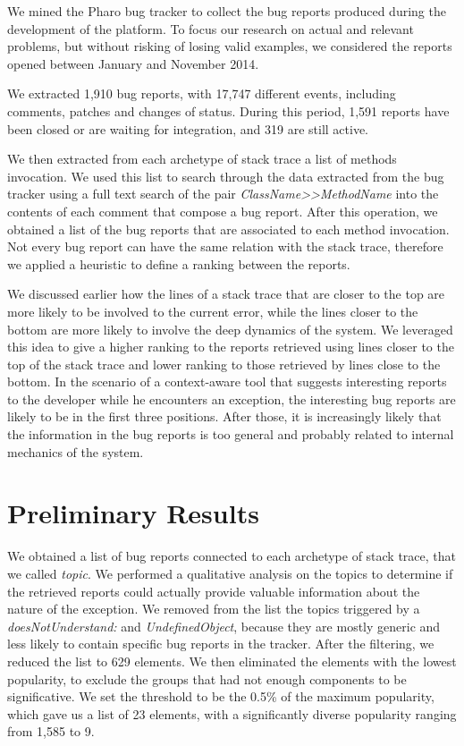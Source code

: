 We mined the Pharo bug tracker to collect the bug reports produced during the development of the platform.
To focus our research on actual and relevant problems, but without risking of losing valid examples, we considered the reports opened between January and November 2014.

We extracted 1,910 bug reports, with 17,747 different events, including comments, patches and changes of status.
During this period, 1,591 reports have been closed or are waiting for integration, and 319 are still active.

We then extracted from each archetype of stack trace a list of methods invocation.
We used this list to search through the data extracted from the bug tracker using a full text search of the pair \emph{ClassName{>}{>}MethodName} into the contents of each comment that compose a bug report.
After this operation, we obtained a list of the bug reports that are associated to each method invocation.
Not every bug report can have the same relation with the stack trace, therefore we applied a heuristic to define a ranking between the reports.

We discussed earlier how the lines of a stack trace that are closer to the top are more likely to be involved to the current error, while the lines closer to the bottom are more likely to involve the deep dynamics of the system.
We leveraged this idea to give a higher ranking to the reports retrieved using lines closer to the top of the stack trace and lower ranking to those retrieved by lines close to the bottom.
In the scenario of a context-aware tool that suggests interesting reports to the developer while he encounters an exception, the interesting bug reports are likely to be in the first three positions.
After those, it is increasingly likely that the information in the bug reports is too general and probably related to internal mechanics of the system.



\section{Preliminary Results}\label{sec:stacktraces-evaluation}

We obtained a list of bug reports connected to each archetype of stack trace, that we called \emph{topic}.
We performed a qualitative analysis on the topics to determine if the retrieved reports could actually provide valuable information about the nature of the exception.
We removed from the list the topics triggered by a \emph{doesNotUnderstand:} and \emph{UndefinedObject}, because they are mostly generic and less likely to contain specific bug reports in the tracker.
After the filtering, we reduced the list to 629 elements.
We then eliminated the elements with the lowest popularity, to exclude the groups that had not enough components to be significative.
We set the threshold to be the 0.5\% of the maximum popularity, which gave us a list of 23 elements, with a significantly diverse popularity ranging from 1,585 to 9.


